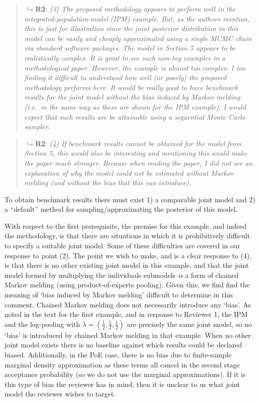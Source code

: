 \documentclass[
  10pt,
  a4paper,
]{article}
\begin{document}
\begin{quote}
\(\hookrightarrow\)\textbf{R2}: \emph{(3) The proposed methodology
appears to perform well in the integrated-population-model (IPM)
example. But, as the authors mention, this is just for illustration
since the joint posterior distribution in this model can be easily and
cheaply approximated using a single MCMC chain via standard software
packages.} \emph{The model in Section 5 appears to be realistically
complex. It is great to see such non-toy examples in a methodological
paper. However, the example is almost too complex: I am finding it
difficult to understand how well (or poorly) the proposed methodology
performs here. It would be really good to have benchmark results for the
joint model without the bias induced by Markov melding (i.e.~in the same
way as these are shown for the IPM example). I would expect that such
results are be attainable using a sequential Monte Carlo sampler.}
\end{quote}

\begin{quote}
\(\hookrightarrow\)\textbf{R2}: \emph{(4) If benchmark results cannot be
obtained for the model from Section 5, this would also be interesting
and mentioning this would make the paper much stronger. Because when
reading the paper, I did not see an explanation of why the model could
not be estimated without Markov melding (and without the bias that this
can introduce).}
\end{quote}

To obtain benchmark results there must exist 1) a comparable joint model
and 2) a ``default'' method for sampling/approximating the posterior of
this model.

With respect to the first prerequisite, the premise for this example,
and indeed the methodology, is that there are situations in which it is
prohibitively difficult to specify a suitable joint model. Some of these
difficulties are covered in our response to point (2). The point we wish
to make, and is a clear response to (4), is that there is no other
existing joint model in this example, and that the joint model formed by
multiplying the individuals submodels \emph{is} a form of chained Markov
melding (using product-of-experts pooling). Given this, we find find the
meaning of `bias induced by Markov melding' difficult to determine in
this comment. Chained Markov melding does not necessarily introduce any
`bias'. As noted in the text for the first example, and in response to
Reviewer 1, the IPM and the log-pooling with
\(\lambda = (\frac{1}{2}, \frac{1}{2}, \frac{1}{2})\) are precisely the
same joint model, so no `bias' is introduced by chained Markov melding
in that example. When no other joint model exists there is no baseline
against which results could be declared biased. Additionally, in the PoE
case, there is no bias due to finite-sample marginal density
approximation as these terms all cancel in the second stage acceptance
probability (so we do not use the marginal approximations). If it is
this type of bias the reviewer has in mind, then it is unclear to us
what joint model the reviewer wishes to target.
\end{document}
